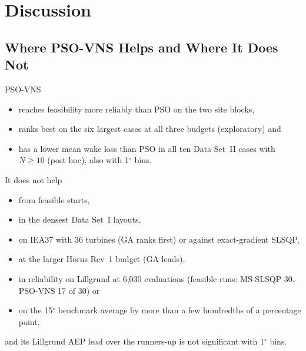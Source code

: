 \section{Discussion}
\label{sec:discussion}
\subsection{Where PSO-VNS Helps and Where It Does Not}
\label{sec:disc-where}
PSO-VNS
\begin{itemize}
\item reaches feasibility more reliably than PSO on the two site blocks,
\item ranks best on the six largest cases at all three budgets (exploratory) and
\item has a lower mean wake loss than PSO in all ten Data Set~II cases with $N\ge10$ (post hoc), also with 1$^\circ$ bins.
\end{itemize}
It does not help
\begin{itemize}
\item from feasible starts,
\item in the densest Data Set~I layouts,
\item on IEA37 with 36 turbines (GA ranks first) or against exact-gradient SLSQP,
\item at the larger Horns Rev~1 budget (GA leads),
\item in reliability on Lillgrund at 6,030 evaluations (feasible runs: MS-SLSQP 30, PSO-VNS 17 of 30) or
\item on the 15$^\circ$ benchmark average by more than a few hundredths of a percentage point,
\end{itemize}
and its Lillgrund AEP lead over the runners-up is not significant with 1$^\circ$ bins.

